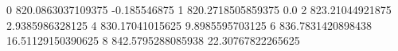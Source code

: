 0 820.0863037109375 -0.185546875
1 820.2718505859375 0.0
2 823.21044921875 2.9385986328125
4 830.17041015625 9.8985595703125
6 836.7831420898438 16.51129150390625
8 842.5795288085938 22.30767822265625
